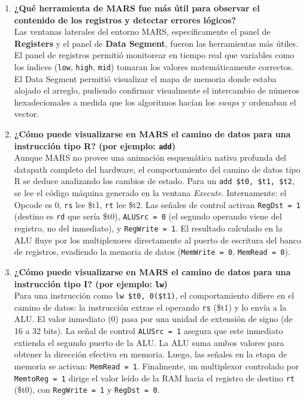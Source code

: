 \documentclass[12pt,letterpaper]{article}
\begin{document}
\begin{enumerate}[label=\textbf{\arabic*.}, leftmargin=*]
    \item \textbf{¿Qué herramienta de MARS fue más útil para observar el contenido de los registros y detectar errores lógicos?} \\
    Las ventanas laterales del entorno MARS, específicamente el panel de \textbf{Registers} y el panel de \textbf{Data Segment}, fueron las herramientas más útiles. El panel de registros permitió monitorear en tiempo real que variables como los índices (\texttt{low}, \texttt{high}, \texttt{mid}) tomaran los valores matemáticamente correctos. El Data Segment permitió visualizar el mapa de memoria donde estaba alojado el arreglo, pudiendo confirmar visualmente el intercambio de números hexadeciomales a medida que los algoritmos hacían los \textit{swaps} y ordenaban el vector.

    \item \textbf{¿Cómo puede visualizarse en MARS el camino de datos para una instrucción tipo R? (por ejemplo: \texttt{add})} \\
    Aunque MARS no provee una animación esquemática nativa profunda del datapath completo del hardware, el comportamiento del camino de datos tipo R se deduce analizando los cambios de estado. Para un \texttt{add \$t0, \$t1, \$t2}, se lee el código máquina generado en la ventana \textit{Execute}. Internamente: el Opcode es 0, \texttt{rs} lee \$t1, \texttt{rt} lee \$t2. Las señales de control activan \texttt{RegDst = 1} (destino es \texttt{rd} que sería \$t0), \texttt{ALUSrc = 0} (el segundo operando viene del registro, no del inmediato), y \texttt{RegWrite = 1}. El resultado calculado en la ALU fluye por los multiplexores directamente al puerto de escritura del banco de registros, evadiendo la memoria de datos (\texttt{MemWrite = 0}, \texttt{MemRead = 0}).

    \item \textbf{¿Cómo puede visualizarse en MARS el camino de datos para una instrucción tipo I? (por ejemplo: \texttt{lw})} \\
    Para una instrucción como \texttt{lw \$t0, 0(\$t1)}, el comportamiento difiere en el camino de datos: la instrucción extrae el operando \texttt{rs} (\$t1) y lo envía a la ALU. El valor inmediato (0) pasa por una unidad de extensión de signo (de 16 a 32 bits). La señal de control \texttt{ALUSrc = 1} asegura que este inmediato extienda el segundo puerto de la ALU. La ALU suma ambos valores para obtener la dirección efectiva en memoria. Luego, las señales en la etapa de memoria se activan: \texttt{MemRead = 1}. Finalmente, un multiplexor controlado por \texttt{MemtoReg = 1} dirige el valor leído de la RAM hacia el registro de destino \texttt{rt} (\$t0), con \texttt{RegWrite = 1} y \texttt{RegDst = 0}.


\end{enumerate}
\end{document}
